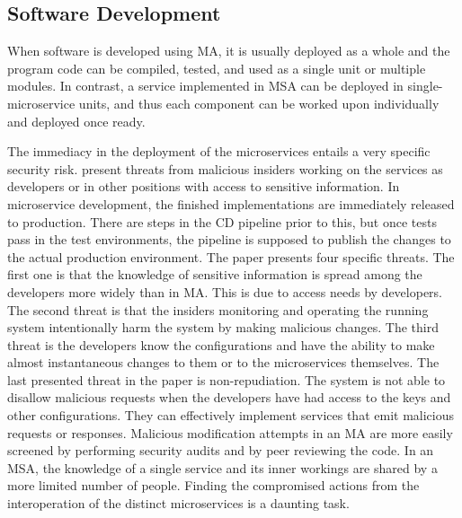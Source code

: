 \subsection{Software Development}
\begin{sloppypar}
    When software is developed using MA, it is usually deployed as a whole and
    the program code can be compiled, tested, and used as a single unit or
    multiple modules. In contrast, a service implemented in MSA can be deployed
    in single-microservice units, and thus each component can be worked upon
    individually and deployed once ready. 
\end{sloppypar}
\begin{sloppypar}
    The immediacy in the deployment of the microservices entails a very specific
    security risk. \citet{integinside} present threats from malicious insiders
    working on the services as developers or in other positions with access to
    sensitive information. In microservice development, the finished
    implementations are immediately released to production. There are steps in
    the CD pipeline prior to this, but once tests pass in the test environments,
    the pipeline is supposed to publish the changes to the actual production
    environment. The paper presents four specific threats. The first one is that
    the knowledge of sensitive information is spread among the developers more
    widely than in MA. This is due to access needs by developers. The second
    threat is that the insiders monitoring and operating the running system
    intentionally harm the system by making malicious changes. The third threat
    is the developers know the configurations and have the ability to make
    almost instantaneous changes to them or to the microservices themselves. The
    last presented threat in the paper is non-repudiation. The system is not
    able to disallow malicious requests when the developers have had access to
    the keys and other configurations. They can effectively implement services
    that emit malicious requests or responses. Malicious modification attempts
    in an MA are more easily screened by performing security audits and by peer
    reviewing the code. In an MSA, the knowledge of a single service and its
    inner workings are shared by a more limited number of people. Finding the
    compromised actions from the interoperation of the distinct microservices is
    a daunting task.
\end{sloppypar}


